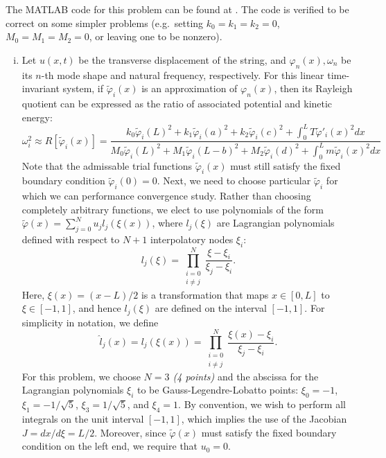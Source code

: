 The MATLAB code for this problem can be found at . 
The code is verified to be correct on some simpler problems (e.g.~setting $k_0 = k_1 = k_2 = 0$, $M_0 = M_1 = M_2 = 0$, or leaving one to be nonzero).
\begin{enumerate}[(i)]
\item { %
    Let $u(x, t)$ be the transverse displacement of the string, and $\varphi_n(x), \omega_n$ be its $n$-th mode shape and natural frequency, respectively.
    For this linear time-invariant system, if $\tilde{\varphi}_i(x)$ is an approximation of $\varphi_n(x)$, then its Rayleigh quotient can be expressed as the ratio of associated potential and kinetic energy:
    \begin{equation}\label{eqn:hw3_p2_rq}
        \omega_i^2 \approx R[\tilde{\varphi}_i(x)] = \frac{
            k_0 {\tilde{\varphi}_i(L)}^2 + 
            k_1 {\tilde{\varphi}_i(a)}^2 + 
            k_2 {\tilde{\varphi}_i(c)}^2 + 
            \int_0^L T {\tilde{\varphi}'_i(x)}^2 dx 
        }{
            M_0 {\tilde{\varphi}_i(L)}^2 + 
            M_1 {\tilde{\varphi}_i(L-b)}^2 + 
            M_2 {\tilde{\varphi}_i(d)}^2 + 
            \int_0^L m {\tilde{\varphi}_i(x)}^2 dx
        }
    \end{equation}
    Note that the admissable trial functions $\tilde{\varphi}_i(x)$ must still satisfy the fixed boundary condition $\tilde{\varphi}_i(0) = 0$. 
    Next, we need to choose particular $\tilde{\varphi}_i$ for which we can performance convergence study.
    Rather than choosing completely arbitrary functions, we elect to use polynomials of the form $\tilde{\varphi}(x) = \sum_{j=0}^N u_j l_j(\xi(x))$, where $l_j(\xi)$ are Lagrangian polynomials defined with respect to $N+1$ interpolatory nodes $\xi_i$:
    \begin{equation}
        l_j(\xi) = \prod_{\substack{i=0 \\ i\neq j}}^N \frac{\xi - \xi_i}{\xi_j - \xi_i}.
    \end{equation}
    Here, $\xi(x) = (x - L)/2$ is a transformation that maps $x \in [0, L]$ to $\xi \in [-1, 1]$, and hence $l_j(\xi)$ are defined on the interval $[-1, 1]$.
    For simplicity in notation, we define 
    \begin{equation}
        \hat{l}_j(x) = l_j(\xi(x)) = \prod_{\substack{i=0 \\ i\neq j}}^N \frac{\xi(x) - \xi_i}{\xi_j - \xi_i}.
    \end{equation}
    For this problem, we choose \emph{$N = 3$ (4 points)} and the abscissa for the Lagrangian polynomials $\xi_i$ to be Gauss-Legendre-Lobatto points: $\xi_0 = -1$, $\xi_1 = -1/\sqrt{5}$, $\xi_3 = 1/\sqrt{5}$, and $\xi_4 = 1$.
    By convention, we wish to perform all integrals on the unit interval $[-1, 1]$, which implies the use of the Jacobian $J = dx / d\xi = L/2$. 
    Moreover, since $\tilde{\varphi}(x)$ must satisfy the fixed boundary condition on the left end, we require that $u_0 = 0$. 

}
\end{enumerate}
